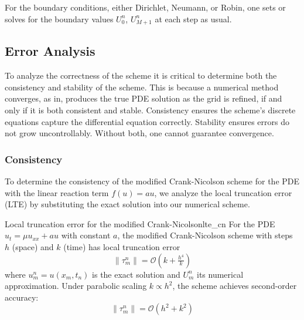 For the boundary conditions, either Dirichlet, Neumann, or Robin, one sets or solves for the boundary
values \(U_0^n\), \(U_{M+1}^n\) at each step as usual.
\subsection{Error Analysis}
To analyze the correctness of the scheme it is critical to determine both the consistency and stability of the
scheme. This is because a numerical method converges, as in, produces the true PDE solution as the grid is refined,
if and only if it is both consistent and stable. Consistency ensures the scheme’s discrete equations capture
the differential equation correctly. Stability ensures errors do not grow uncontrollably. Without both, one cannot
guarantee convergence.
\subsubsection{Consistency}
To determine the consistency of the modified Crank-Nicolson scheme for the PDE with the linear reaction term
$f(u) = au$, we analyze the local truncation error (LTE) by substituting the exact solution into our
numerical scheme.
\begin{theorem}{Local truncation error for the modified Crank-Nicolson}{lte_cn}
  For the PDE $u_t = \mu u_{xx} + au$ with constant $a$, the modified Crank-Nicolson scheme with steps $h$ (space)
  and $k$ (time) has local truncation error
  \[
    \|\tau_m^n\| = \mathcal{O}\!\left(k +\tfrac{h^4}{k}\right)
  \]
  where $u_m^n = u(x_m,t_n)$ is the exact solution and $U_m^n$ its numerical approximation.
  Under parabolic scaling $k \propto h^2$, the scheme achieves second-order accuracy:
  \[
    \|\tau_m^n\| = \mathcal{O}\!\left(h^2 + k^2\right)
  \]
\end{theorem}


